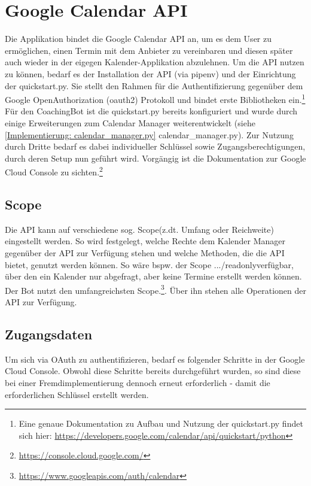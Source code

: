         
    \section{Google Calendar API} \label{Google Calendar API}
        Die Applikation bindet die Google Calendar API \cite{googleCalAPI} an, um es dem User zu ermöglichen, einen Termin mit dem Anbieter zu vereinbaren und diesen später auch wieder in der eigegen Kalender-Applikation abzulehnen.
        Um die API nutzen zu können, bedarf es der Installation der API (via pipenv) und der Einrichtung der quickstart.py. Sie stellt den Rahmen für die Authentifizierung gegenüber dem Google Open\-Authorization (oauth2) Protokoll und bindet erste Bibliotheken ein.\footnote{Eine genaue Dokumentation zu Aufbau und Nutzung der quickstart.py findet sich hier: \url{https://developers.google.com/calendar/api/quickstart/python}}
        Für den CoachingBot ist die quickstart.py bereits konfiguriert und wurde durch einige Erweiterungen zum Calendar Manager weiterentwickelt (siehe \ref{Implementierung: calendar_manager.py} calendar\_manager.py). Zur Nutzung durch Dritte bedarf es dabei individueller Schlüssel sowie Zugangsberechtigungen, durch deren Setup nun geführt wird. Vorgängig ist die Dokumentation zur Google Cloud Console zu sichten.\footnote{\url{https://console.cloud.google.com/}}
        
        \subsection{Scope}
            Die API kann auf verschiedene sog. \glq Scope\grq (z.dt. Umfang oder Reichweite) eingestellt werden. So wird festgelegt, welche Rechte dem Kalender Manager gegenüber der API zur Verfügung stehen und welche Methoden, die die API bietet, genutzt werden können. So wäre bspw. der Scope \glqq.../readonly\grqq verfügbar, über den ein Kalender nur abgefragt, aber keine Termine erstellt werden können. Der Bot nutzt den umfangreichsten Scope.\footnote{\url{https://www.googleapis.com/auth/calendar}}. Über ihn stehen alle Operationen der API zur Verfügung.
        
        \subsection{Zugangsdaten}
            Um sich via OAuth zu authentifizieren, bedarf es folgender Schritte in der Google Cloud Console. Obwohl diese Schritte bereits durchgeführt wurden, so sind diese bei einer Fremdimplementierung dennoch erneut erforderlich - damit die erforderlichen Schlüssel erstellt werden. 
        
